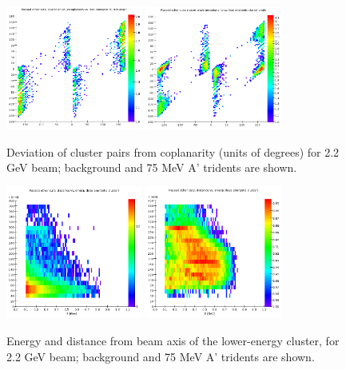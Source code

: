 \begin{figure}[ht]
	\includegraphics[width=0.4\textwidth]{performance/coplanarity_22}
	\includegraphics[width=0.4\textwidth]{performance/coplanarity_22_075mev}
	\caption{\small{Deviation of cluster pairs from coplanarity (units of degrees) for 2.2 GeV beam; background and 75 MeV A' tridents are shown.}}
	\label{fig:coplanarity}
\end{figure}

\begin{figure}[ht]
	\includegraphics[width=0.4\textwidth]{performance/energy-distance_22}
	\includegraphics[width=0.4\textwidth]{performance/energy-distance_22_075mev}
	\caption{\small{Energy and distance from beam axis of the lower-energy cluster, for 2.2 GeV beam; background and 75 MeV A' tridents are shown.}}
	\label{fig:energy-distance}
\end{figure}

